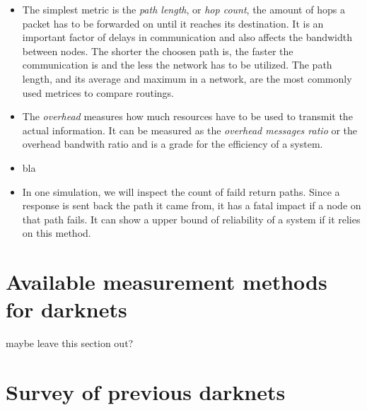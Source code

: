 \begin{itemize}
\item The simplest metric is the \emph{path length}, or \emph{hop count}, the amount of hops a packet has to be forwarded on until it reaches its destination. It is an important factor of delays in communication and also affects the bandwidth between nodes. The shorter the choosen path is, the faster the communication is and the less the network has to be utilized. The path length, and its average and maximum in a network, are the most commonly used metrices to compare routings.

\item The \emph{overhead} measures how much resources have to be used to transmit the actual information. It can be measured as the \emph{overhead messages ratio} or the overhead bandwith ratio and is a grade for the efficiency of a system.

\item bla

\item In one simulation, we will inspect the count of faild return paths. Since a response is sent back the path it came from, it has a fatal impact if a node on that path fails. It can show a upper bound of reliability of a system if it relies on this method.
\end{itemize}

\section{Available measurement methods for darknets}

maybe leave this section out?

\section{Survey of previous darknets}



